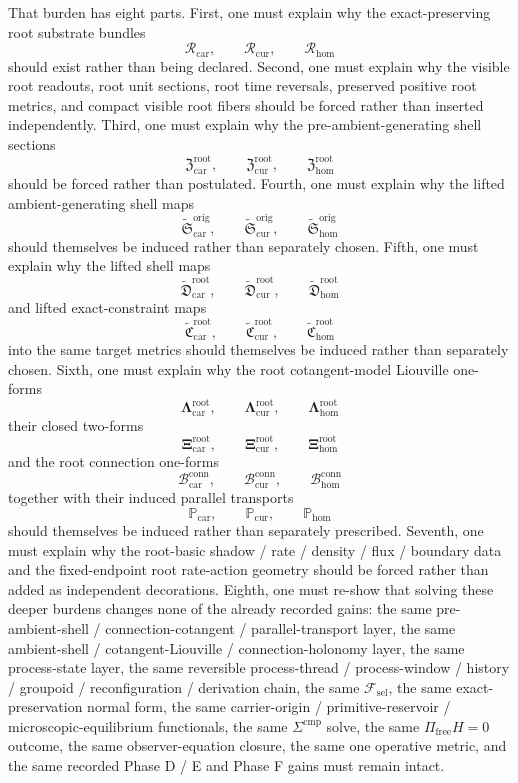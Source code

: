 \documentclass[11pt]{article}
\newcommand{\StemFunctional}{\mathscr F_{\mathrm{sel}}}
\newcommand{\TensorRootSpace}{\mathcal R_{\mathrm{car}}}
\newcommand{\CurRootSpace}{\mathcal R_{\mathrm{cur}}}
\newcommand{\HomRootSpace}{\mathcal R_{\mathrm{hom}}}
\newcommand{\TensorRootSection}{\mathfrak Z_{\mathrm{car}}^{\mathrm{root}}}
\newcommand{\CurRootSection}{\mathfrak Z_{\mathrm{cur}}^{\mathrm{root}}}
\newcommand{\HomRootSection}{\mathfrak Z_{\mathrm{hom}}^{\mathrm{root}}}
\newcommand{\TensorLiftedAmbientSection}{\widetilde{\mathfrak S}_{\mathrm{car}}^{\mathrm{orig}}}
\newcommand{\CurLiftedAmbientSection}{\widetilde{\mathfrak S}_{\mathrm{cur}}^{\mathrm{orig}}}
\newcommand{\HomLiftedAmbientSection}{\widetilde{\mathfrak S}_{\mathrm{hom}}^{\mathrm{orig}}}
\newcommand{\TensorRootLiftedShellSection}{\widetilde{\mathfrak D}_{\mathrm{car}}^{\mathrm{root}}}
\newcommand{\CurRootLiftedShellSection}{\widetilde{\mathfrak D}_{\mathrm{cur}}^{\mathrm{root}}}
\newcommand{\HomRootLiftedShellSection}{\widetilde{\mathfrak D}_{\mathrm{hom}}^{\mathrm{root}}}
\newcommand{\TensorRootConstraintMap}{\widetilde{\mathfrak C}_{\mathrm{car}}^{\mathrm{root}}}
\newcommand{\CurRootConstraintMap}{\widetilde{\mathfrak C}_{\mathrm{cur}}^{\mathrm{root}}}
\newcommand{\HomRootConstraintMap}{\widetilde{\mathfrak C}_{\mathrm{hom}}^{\mathrm{root}}}
\newcommand{\TensorRootLiouville}{\boldsymbol{\Lambda}_{\mathrm{car}}^{\mathrm{root}}}
\newcommand{\CurRootLiouville}{\boldsymbol{\Lambda}_{\mathrm{cur}}^{\mathrm{root}}}
\newcommand{\HomRootLiouville}{\boldsymbol{\Lambda}_{\mathrm{hom}}^{\mathrm{root}}}
\newcommand{\TensorRootTwo}{\boldsymbol{\Xi}_{\mathrm{car}}^{\mathrm{root}}}
\newcommand{\CurRootTwo}{\boldsymbol{\Xi}_{\mathrm{cur}}^{\mathrm{root}}}
\newcommand{\HomRootTwo}{\boldsymbol{\Xi}_{\mathrm{hom}}^{\mathrm{root}}}
\newcommand{\TensorRootConnectionForm}{\mathcal B_{\mathrm{car}}^{\mathrm{conn}}}
\newcommand{\CurRootConnectionForm}{\mathcal B_{\mathrm{cur}}^{\mathrm{conn}}}
\newcommand{\HomRootConnectionForm}{\mathcal B_{\mathrm{hom}}^{\mathrm{conn}}}
\newcommand{\TensorRootTransport}{\mathbb P_{\mathrm{car}}}
\newcommand{\CurRootTransport}{\mathbb P_{\mathrm{cur}}}
\newcommand{\HomRootTransport}{\mathbb P_{\mathrm{hom}}}
\begin{document}
That burden has eight parts. First, one must explain why the exact-preserving root substrate bundles
\[
\TensorRootSpace,\qquad
\CurRootSpace,\qquad
\HomRootSpace
\]
should exist rather than being declared. Second, one must explain why the visible root readouts, root unit sections, root time reversals, preserved positive root metrics, and compact visible root fibers should be forced rather than inserted independently. Third, one must explain why the pre-ambient-generating shell sections
\[
\TensorRootSection,\qquad
\CurRootSection,\qquad
\HomRootSection
\]
should be forced rather than postulated. Fourth, one must explain why the lifted ambient-generating shell maps
\[
\TensorLiftedAmbientSection,\qquad
\CurLiftedAmbientSection,\qquad
\HomLiftedAmbientSection
\]
should themselves be induced rather than separately chosen. Fifth, one must explain why the lifted shell maps
\[
\TensorRootLiftedShellSection,\qquad
\CurRootLiftedShellSection,\qquad
\HomRootLiftedShellSection
\]
and lifted exact-constraint maps
\[
\TensorRootConstraintMap,\qquad
\CurRootConstraintMap,\qquad
\HomRootConstraintMap
\]
into the same target metrics should themselves be induced rather than separately chosen. Sixth, one must explain why the root cotangent-model Liouville one-forms
\[
\TensorRootLiouville,\qquad
\CurRootLiouville,\qquad
\HomRootLiouville
\]
their closed two-forms
\[
\TensorRootTwo,\qquad
\CurRootTwo,\qquad
\HomRootTwo
\]
and the root connection one-forms
\[
\TensorRootConnectionForm,\qquad
\CurRootConnectionForm,\qquad
\HomRootConnectionForm
\]
together with their induced parallel transports
\[
\TensorRootTransport,\qquad
\CurRootTransport,\qquad
\HomRootTransport
\]
should themselves be induced rather than separately prescribed. Seventh, one must explain why the root-basic shadow / rate / density / flux / boundary data and the fixed-endpoint root rate-action geometry should be forced rather than added as independent decorations. Eighth, one must re-show that solving these deeper burdens changes none of the already recorded gains: the same pre-ambient-shell / connection-cotangent / parallel-transport layer, the same ambient-shell / cotangent-Liouville / connection-holonomy layer, the same process-state layer, the same reversible process-thread / process-window / history / groupoid / reconfiguration / derivation chain, the same \(\StemFunctional\), the same exact-preservation normal form, the same carrier-origin / primitive-reservoir / microscopic-equilibrium functionals, the same \(\Sigma^{\mathrm{cmp}}\) solve, the same \(\Pi_{\mathrm{free}}H=0\) outcome, the same observer-equation closure, the same one operative metric, and the same recorded Phase D / E and Phase F gains must remain intact.
\end{document}

